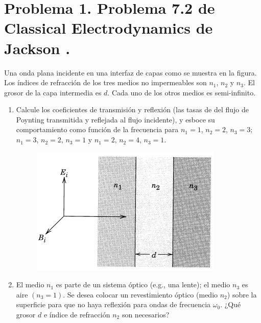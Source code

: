 \documentclass[a4paper,11pt]{article}
\numberwithin{equation}{section}
\renewcommand{\thefootnote}{\fnsymbol{footnote}}
\begin{document}

\fancyhead[R]{\thepage}

\setcounter{footnote}{0}
\renewcommand*{\thefootnote}{\arabic{footnote}}


\section{Problema 1. Problema 7.2 de Classical Electrodynamics
de Jackson \cite{jackson}.}

Una onda plana incidente en una interfaz de capas como se muestra en la figura. Los 
índices de refracción de los tres medios no impermeables son $n_1$, $n_2$ y $n_3$. 
El grosor de la capa intermedia es $d$. Cada uno de los otros medios es semi-infinito.

\begin{enumerate}[label=\textbf{(\alph*)}]
 \item Calcule los coeficientes de transmisión y reflexión (las tasas de del flujo de 
 Poynting transmitida y reflejada al flujo incidente), y esboce su comportamiento como 
 función de la frecuencia para $n_1 = 1$, $n_2 = 2$, $n_3 = 3$; $n_1 = 3$, $n_2 = 2$, 
 $n_3 = 1$ y $n_1 = 2$, $n_2 = 4$, $n_3 = 1$.

\begin{figure}[H]
 \center 
 \includegraphics[scale=0.7]{problema1fig1}
\end{figure}

\item El medio $n_1$ es parte de un sistema óptico (e.g., una lente); el medio 
$n_3$ es aire $(n_3 = 1)$. Se desea colocar un revestimiento óptico (medio $n_2$) 
sobre la superficie para que no haya reflexión para ondas de frecuencia $\omega_0$. 
¿Qué grosor $d$ e índice de refracción $n_2$ son necesarios?

\end{enumerate}
\end{document}
